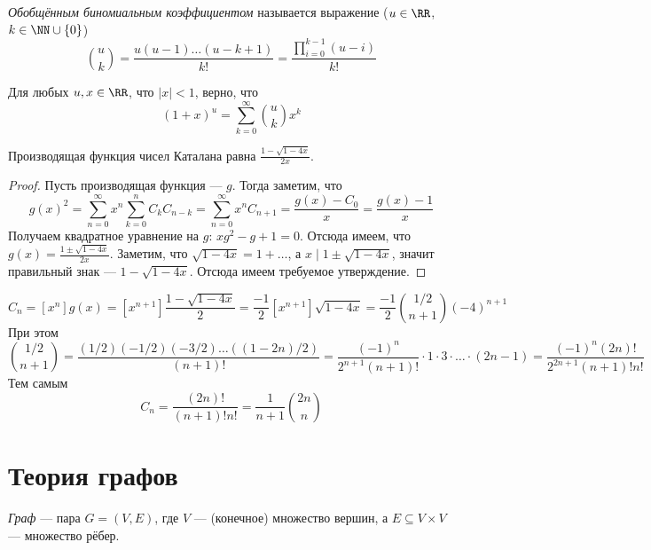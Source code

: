 \documentclass[12pt,a4paper]{article}
\begin{document}
    \begin{definition}
        \emph{Обобщённым биномиальным коэффициентом} называется выражение ($u \in \RR$, $k \in \NN \cup\{0\}$)
        \[\binom{u}{k} = \frac{u(u-1)\dots(u-k+1)}{k!} = \frac{\prod_{i=0}^{k-1}(u-i)}{k!}\]
    \end{definition}

    \begin{theorem}
        Для любых $u, x \in \RR$, что $|x| < 1$, верно, что
        \[(1+x)^u = \sum_{k=0}^\infty \binom{u}{k} x^k\]
    \end{theorem}

    \begin{statement}
        Производящая функция чисел Каталана равна $\frac{1-\sqrt{1-4x}}{2x}$.
    \end{statement}

    \begin{proof}
        Пусть производящая функция --- $g$. Тогда заметим, что
        \[g(x)^2 = \sum_{n=0}^\infty x^n \sum_{k=0}^n C_k C_{n-k} = \sum_{n=0}^\infty x^n C_{n+1} = \frac{g(x) - C_0}{x} =\frac{g(x) - 1}{x}\]
        Получаем квадратное уравнение на $g$: $xg^2-g+1=0$. Отсюда имеем, что $g(x)=\frac{1\pm\sqrt{1-4x}}{2x}$. Заметим, что $\sqrt{1-4x} = 1 + \dots$, а $x \mid 1\pm\sqrt{1-4x}$, значит правильный знак --- $1-\sqrt{1-4x}$. Отсюда имеем требуемое утверждение.
    \end{proof}

    \begin{corollary}
        \[C_n = [x^n]g(x) = [x^{n+1}] \frac{1-\sqrt{1-4x}}{2}=\frac{-1}{2}[x^{n+1}]\sqrt{1-4x}=\frac{-1}{2}\binom{1/2}{n+1}(-4)^{n+1}\]
        При этом
        \[\binom{1/2}{n+1} = \frac{(1/2)(-1/2)(-3/2)\dots((1-2n)/2)}{(n+1)!} = \frac{(-1)^n}{2^{n+1}(n+1)!} \cdot 1 \cdot 3 \cdot \dots \cdot (2n-1) = \frac{(-1)^n(2n)!}{2^{2n+1}(n+1)!n!}\]
        Тем самым
        \[C_n = \frac{(2n)!}{(n+1)!n!} = \frac{1}{n+1}\binom{2n}{n}\]
    \end{corollary}

    \section{Теория графов}

    \begin{definition}
        \emph{Граф} --- пара $G = (V, E)$, где $V$ --- (конечное) множество вершин, а $E \subseteq V \times V$ --- множество рёбер.
    \end{definition}
\end{document}

